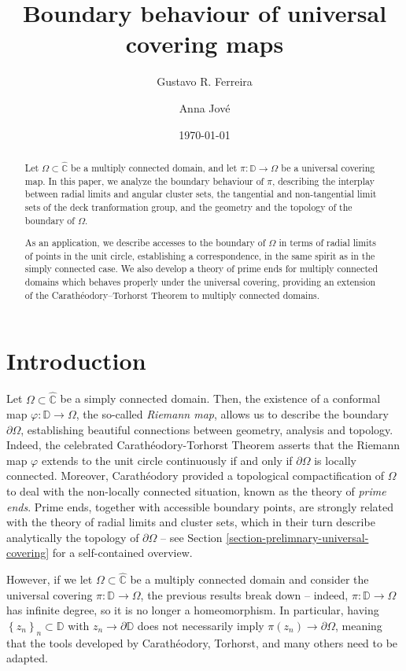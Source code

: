 \documentclass[11pt,a4paper,reqno]{amsart}
\title{Boundary behaviour of universal covering maps}
\author[G. R. Ferreira]{Gustavo R. Ferreira}
\author[A. Jov\'e]{Anna Jov\'e}
\date{\today}
\theoremstyle{plain}
\theoremstyle{definition}
\theoremstyle{plain}
\def\Chat{\widehat{\mathbb{C}}}
\begin{document}
\begin{abstract}
	Let $ \Omega \subset\Chat$ be a multiply connected domain, and let $ \pi\colon \mathbb{D}\to\Omega $ be a universal covering map. In this paper, we analyze the boundary behaviour of $ \pi $, describing the interplay between radial limits and angular cluster sets,   the tangential and non-tangential limit sets of the deck tranformation group, and the geometry and the topology of the boundary of $ \Omega $.
	
	As an application, we describe accesses to the boundary of $ \Omega $ in terms of radial limits of points in the unit circle, establishing a correspondence, in the same spirit as in the simply connected case. We also develop a theory of prime ends for multiply connected domains which behaves properly under the universal covering, providing an extension of the Carath\'eodory--Torhorst Theorem to multiply connected domains.
\end{abstract}
\maketitle

\section{Introduction}

Let $ \Omega\subset\Chat $ be a simply connected domain. Then, the existence of a conformal map $ \varphi\colon\mathbb{D}\to\Omega $, the so-called {\em Riemann map}, allows us to describe the boundary $ \partial\Omega $, establishing beautiful connections between geometry, analysis and topology. Indeed,  the celebrated Carathéodory-Torhorst Theorem asserts that the Riemann map $ \varphi $ extends to the unit circle continuously if and only if $ \partial\Omega $ is locally connected. Moreover, Carathéodory provided a topological compactification of $ \Omega $ to deal with the non-locally connected situation, known as the theory of \textit{prime ends}. Prime ends, together with accessible boundary points, are strongly related with the theory of radial limits and cluster sets, which in their turn describe analytically the topology of $ \partial\Omega $ -- see Section \ref{section-prelimnary-universal-covering} for a self-contained overview.

However, if we let $ \Omega\subset\Chat $ be a multiply connected domain and consider the universal covering $ \pi\colon\mathbb{D}\to\Omega $, the previous results break down -- indeed, $ \pi\colon\mathbb{D}\to\Omega $ has infinite degree, so it is no longer a homeomorphism. In particular, having $ \left\lbrace z_n\right\rbrace _n\subset\mathbb{D} $ with $ z_n\to\partial \mathbb{D} $ does not necessarily imply $ \pi(z_n)\to\partial\Omega $, meaning that the tools developed by Carathéodory, Torhorst, and many others need to be adapted.
\end{document}

